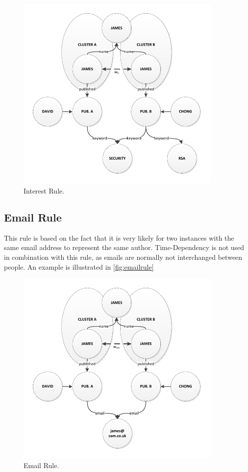 \begin{figure}[h!]
	\centering
		\includegraphics[width=0.9\textwidth]{fig/interestrule}
	\caption{Interest Rule.}
	\label{fig:interestrule}
\end{figure}

\subsection{Email Rule}

This rule is based on the fact that it is very likely for two instances with the same email address to represent the same author. Time-Dependency is not used in combination with this rule, as emails are normally not interchanged between people. An example is illustrated in \autoref{fig:emailrule}

\begin{figure}[h!]
	\centering
		\includegraphics[width=0.9\textwidth]{fig/emailrule}
	\caption{Email Rule.}
	\label{fig:emailrule}
\end{figure}

